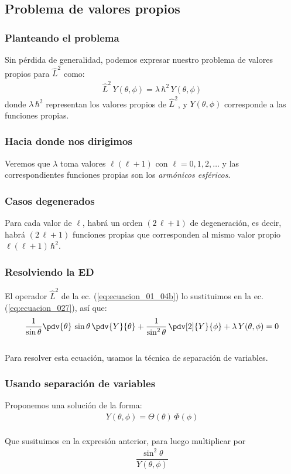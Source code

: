 \subsection{Problema de valores propios}
\begin{frame}
\frametitle{Planteando el problema}
Sin pérdida de generalidad, podemos expresar nuestro problema de valores propios para $\hat{L}^{2}$ como:
\begin{align}
\hat{L}^{2} \, Y(\theta, \phi) = \lambda \, \hbar^{2} \, Y(\theta, \phi)
\label{eq:ecuacion_027}
\end{align}
donde $\lambda \, \hbar^{2}$ representan los valores propios de $\hat{L}^{2}$, y $Y(\theta, \phi)$ corresponde a las funciones propias. 
\end{frame}
\begin{frame}
\frametitle{Hacia donde nos dirigimos}
Veremos que $\lambda$ toma valores $\ell (\ell + 1)$ con $\ell = 0, 1, 2, \ldots$ y las correspondientes funciones propias son los \emph{armónicos esféricos}.
\end{frame}
\begin{frame}
\frametitle{Casos degenerados}
Para cada valor de $\ell$, habrá un orden $(2 \, \ell + 1)$ de degeneración, es decir, habrá $(2 \, \ell + 1)$ funciones propias que corresponden al mismo valor propio $\ell (\ell + 1) \, \hbar^{2}$.
\end{frame}
\begin{frame}
\frametitle{Resolviendo la ED}
El operador $\hat{L}^{2}$ de la ec. (\ref{eq:ecuacion_01_04b}) lo sustituimos en la ec. (\ref{eq:ecuacion_027}), así que:
{\fontsize{12}{12}\selectfont
\begin{align}
\dfrac{1}{\sin \theta} \pdv{\theta} \, \sin \theta \, \pdv{Y}{\theta} + \dfrac{1}{\sin^{2} \theta} \, \pdv[2]{Y}{\phi} + \lambda \, Y(\theta, \phi) = 0
\end{align}}
\\
\bigskip
\pause
Para resolver esta ecuación, usamos la técnica de separación de variables.
\end{frame}
\begin{frame}
\frametitle{Usando separación de variables}
Proponemos una solución de la forma:
\begin{align}
Y(\theta, \phi) = \Theta(\theta) \, \Phi(\phi)
\label{eq:ecuacion_029}
\end{align}
\\
\bigskip
\pause
Que susituimos en la expresión anterior, para luego multiplicar por
\begin{align*}
\dfrac{\sin^{2} \theta}{Y(\theta, \phi)}
\end{align*}
\end{frame}

